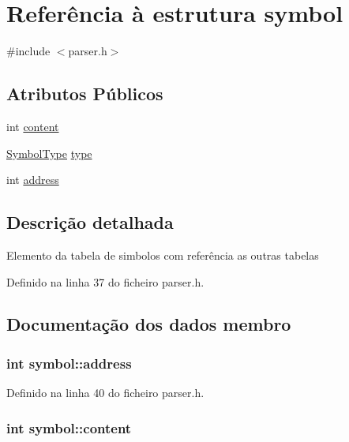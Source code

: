 \hypertarget{structsymbol}{\section{Referência à estrutura symbol}
\label{structsymbol}
}


{\ttfamily \#include $<$parser.\-h$>$}

\subsection*{Atributos Públicos}
\begin{DoxyCompactItemize}
\item 
int \hyperlink{structsymbol_a72c61f7152e8fadf84f1d13136ba741b}{content}
\item 
\hyperlink{parser_8h_add8909e1085c0c32f8380ff493a243b3}{Symbol\-Type} \hyperlink{structsymbol_adba0eaeb4bfbf4787bd3899e4202cc90}{type}
\item 
int \hyperlink{structsymbol_aa61e9dd64d1465422a2b39ca16dc3aca}{address}
\end{DoxyCompactItemize}


\subsection{Descrição detalhada}
Elemento da tabela de simbolos com referência as outras tabelas 

Definido na linha 37 do ficheiro parser.\-h.



\subsection{Documentação dos dados membro}
\hypertarget{structsymbol_aa61e9dd64d1465422a2b39ca16dc3aca}{
\subsubsection[{address}]{\setlength{\rightskip}{0pt plus 5cm}int symbol\-::address}}\label{structsymbol_aa61e9dd64d1465422a2b39ca16dc3aca}


Definido na linha 40 do ficheiro parser.\-h.

\hypertarget{structsymbol_a72c61f7152e8fadf84f1d13136ba741b}{
\subsubsection[{content}]{\setlength{\rightskip}{0pt plus 5cm}int symbol\-::content}}\label{structsymbol_a72c61f7152e8fadf84f1d13136ba741b}


